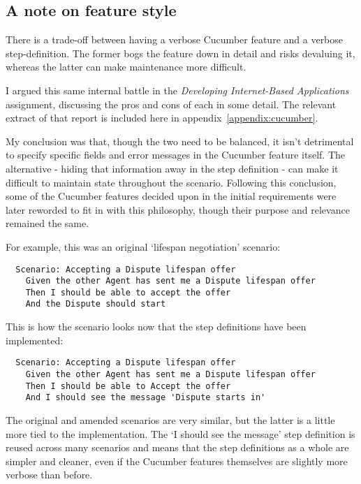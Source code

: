 \subsection{A note on feature style}

There is a trade-off between having a verbose Cucumber feature and a verbose step-definition. The former bogs the feature down in detail and risks devaluing it, whereas the latter can make maintenance more difficult.

I argued this same internal battle in the \emph{Developing Internet-Based Applications} assignment, discussing the pros and cons of each in some detail. The relevant extract of that report is included here in appendix~\ref{appendix:cucumber}.

My conclusion was that, though the two need to be balanced, it isn't detrimental to specify specific fields and error messages in the Cucumber feature itself. The alternative - hiding that information away in the step definition - can make it difficult to maintain state throughout the scenario. Following this conclusion, some of the Cucumber features decided upon in the initial requirements were later reworded to fit in with this philosophy, though their purpose and relevance remained the same.

For example, this was an original `lifespan negotiation' scenario:

\begin{lstlisting}
  Scenario: Accepting a Dispute lifespan offer
    Given the other Agent has sent me a Dispute lifespan offer
    Then I should be able to accept the offer
    And the Dispute should start
\end{lstlisting}

This is how the scenario looks now that the step definitions have been implemented:

\begin{lstlisting}
  Scenario: Accepting a Dispute lifespan offer
    Given the other Agent has sent me a Dispute lifespan offer
    Then I should be able to Accept the offer
    And I should see the message 'Dispute starts in'
\end{lstlisting}

The original and amended scenarios are very similar, but the latter is a little more tied to the implementation. The `I should see the message' step definition is reused across many scenarios and means that the step definitions as a whole are simpler and cleaner, even if the Cucumber features themselves are slightly more verbose than before.

